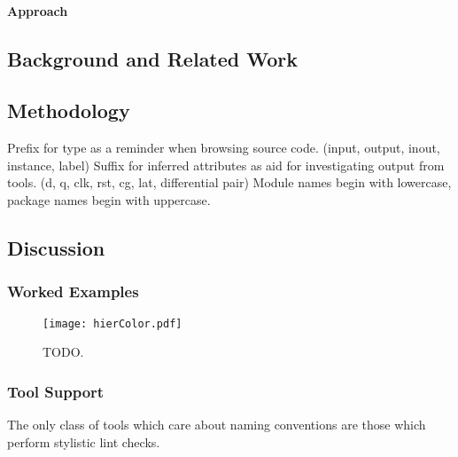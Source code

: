 \documentclass[a4paper]{article}
\begin{document}

\paragraph{Approach} %
\label{sec:HungarianNotation_approach}


\subsection{Background and Related Work} %
\label{sec:HungarianNotation_background}


\subsection{Methodology} %
\label{sec:HungarianNotation_methodology}
Prefix for type as a reminder when browsing source code. (input, output, inout, instance, label)
Suffix for inferred attributes as aid for investigating output from tools. (d,
q, clk, rst, cg, lat, differential pair)
Module names begin with lowercase, package names begin with uppercase.


\subsection{Discussion} %
\label{sec:HungarianNotation_discussion}

\subsubsection{Worked Examples} %
\label{sec:HungarianNotation_workedExamples}

\begin{figure}[t] %
\centering
\texttt{[image: hierColor.pdf]}
\caption{TODO.
\label{fig:hierColor}}
\end{figure} %


\subsubsection{Tool Support} %
\label{sec:HungarianNotation_toolSupport}
The only class of tools which care about naming conventions are those which
perform stylistic lint checks.
\end{document}
